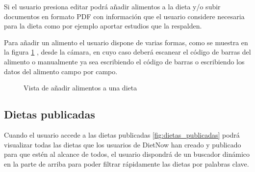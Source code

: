 Si el usuario presiona editar podrá añadir alimentos a la dieta y/o subir documentos en formato PDF con información que el usuario considere necesaria para la dieta como por ejemplo aportar estudios que la respalden.

Para añadir un alimento el usuario dispone de varias formas, como se muestra en la figura \ref{fig:añadir_alimentos} , desde la cámara, en cuyo caso deberá escanear el código de barras del alimento o manualmente ya sea escribiendo el código de barras o escribiendo los datos del alimento campo por campo.
\begin{figure}[H]
    \centering
    \caption{Vista de añadir alimentos a una dieta}
    \label{fig:añadir_alimentos}
\end{figure}


\subsection{Dietas publicadas}
Cuando el usuario accede a las dietas publicadas \ref{fig:dietas_publicadas} podrá visualizar todas las dietas que los usuarios de DietNow han creado y publicado para que estén al alcance de todos, el usuario dispondrá de un buscador dinámico en la parte de arriba para poder filtrar rápidamente las dietas por palabras clave. 

